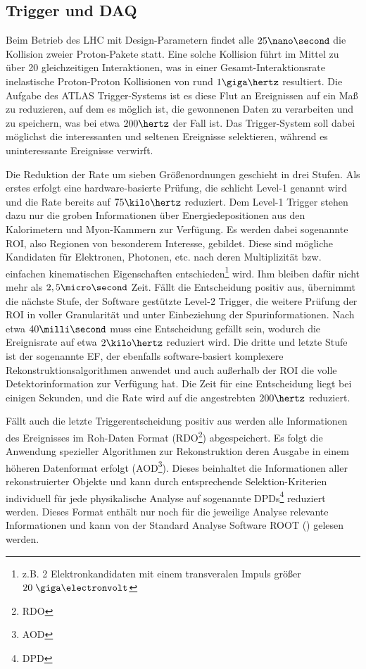 \subsection{Trigger und DAQ}
\label{trigger_daq}
Beim Betrieb des \ac{LHC} mit Design-Parametern findet alle $25\nano\second$
die Kollision zweier Proton-Pakete statt. Eine solche Kollision führt im Mittel
zu über 20 gleichzeitigen Interaktionen, was in einer Gesamt-Interaktionsrate
inelastische Proton-Proton Kollisionen von rund $1\giga\hertz$ resultiert. Die
Aufgabe des ATLAS Trigger-Systems ist es diese Flut an Ereignissen auf ein Maß
zu reduzieren, auf dem es möglich ist, die gewonnenen Daten zu verarbeiten und
zu speichern, was bei etwa $200\hertz$ der Fall ist. Das Trigger-System soll
dabei möglichst die interessanten und seltenen Ereignisse selektieren, während
es uninteressante Ereignisse verwirft.

Die Reduktion der Rate um sieben Größenordnungen geschieht in drei Stufen.
Als erstes erfolgt eine hardware-basierte Prüfung, die schlicht Level-1 genannt
wird und die Rate bereits auf $75\kilo\hertz$ reduziert. Dem Level-1 Trigger
stehen dazu nur die groben Informationen über Energiedepositionen aus den
Kalorimetern und Myon-Kammern zur Verfügung. Es werden dabei sogenannte
\acf{ROI}, also Regionen von besonderem Interesse, gebildet. Diese sind
mögliche Kandidaten für Elektronen, Photonen, etc. nach deren Multiplizität
bzw. einfachen kinematischen Eigenschaften entschieden\footnote{z.B. 2
Elektronkandidaten mit einem transveralen Impuls größer $20\GeV$} wird. Ihm
bleiben dafür nicht mehr als $2,5\micro\second$ Zeit. Fällt die Entscheidung
positiv aus, übernimmt die nächste Stufe, der Software gestützte Level-2
Trigger, die weitere Prüfung der \ac{ROI} in voller Granularität und unter
Einbeziehung der Spurinformationen. Nach etwa $40\milli\second$ muss eine
Entscheidung gefällt sein, wodurch die Ereignisrate auf etwa $2\kilo\hertz$
reduziert wird. Die dritte und letzte Stufe ist der sogenannte \acf{EF}, der
ebenfalls software-basiert komplexere Rekonstruktionsalgorithmen anwendet und
auch außerhalb der \ac{ROI} die volle Detektorinformation zur Verfügung hat.
Die Zeit für eine Entscheidung liegt bei einigen Sekunden, und die Rate wird
auf die angestrebten $200\hertz$ reduziert.  

Fällt auch die letzte Triggerentscheidung positiv aus werden alle Informationen
des Ereignisses im Roh-Daten Format (RDO\footnote{\acf{RDO}}) abgespeichert. Es
folgt die Anwendung spezieller Algorithmen zur Rekonstruktion deren Ausgabe in
einem höheren Datenformat erfolgt (AOD\footnote{\acf{AOD}}). Dieses beinhaltet
die Informationen aller rekonstruierter Objekte und kann durch entsprechende
Selektion-Kriterien individuell für jede physikalische Analyse auf sogenannte
DPDs\footnote{\acf{DPD}} reduziert werden. Dieses Format enthält nur noch für
die jeweilige Analyse relevante Informationen und kann von der Standard
Analyse Software \textsc{ROOT} (\cite{Brun:2000es}) gelesen werden.

